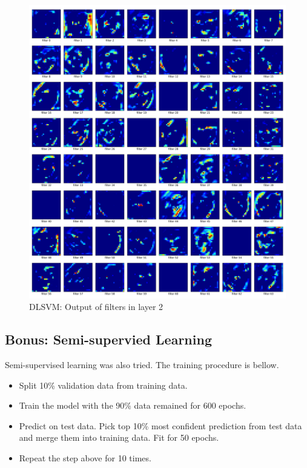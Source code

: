 \documentclass[fleqn,a4paper,12pt]{article}
\begin{document}
\begin{figure}[H]
  \centering
  \includegraphics[width=\linewidth]{report-imgs/dlsvm-filter-output.png}
  \caption{DLSVM: Output of filters in layer 2}
  \label{fig:Output of filters in layer 2}
\end{figure}


\subsection*{Bonus: Semi-supervied Learning}

Semi-supervised learning was also tried. The training procedure is bellow.

\begin{itemize}
\item Split 10\% validation data from training data.
\item Train the model with the 90\% data remained for 600 epochs.
\item Predict on test data. Pick top 10\% most confident prediction from test data and merge them into training data. Fit for 50 epochs.
\item Repeat the step above for 10 times.
\end{itemize}
\end{document}
